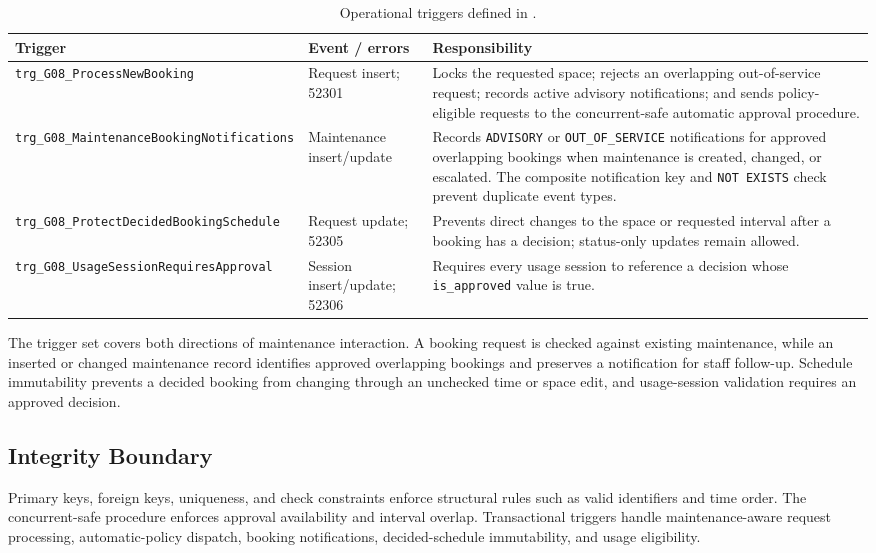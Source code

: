 \begin{table}[H]
  \centering
  \scriptsize
  \begin{tabularx}{\textwidth}{>{\raggedright\arraybackslash}p{4.8cm}>{\raggedright\arraybackslash}p{2.3cm}X}
    \toprule
    \textbf{Trigger} & \textbf{Event / errors} & \textbf{Responsibility}\\
    \midrule
    \nolinkurl{trg_G08_ProcessNewBooking} &
    Request insert; 52301 &
    Locks the requested space; rejects an overlapping out-of-service request; records active advisory notifications; and sends policy-eligible requests to the concurrent-safe automatic approval procedure.\\
    \nolinkurl{trg_G08_MaintenanceBookingNotifications} &
    Maintenance insert/update &
    Records \texttt{ADVISORY} or \texttt{OUT\_OF\_SERVICE} notifications for approved overlapping bookings when maintenance is created, changed, or escalated. The composite notification key and \texttt{NOT EXISTS} check prevent duplicate event types.\\
    \nolinkurl{trg_G08_ProtectDecidedBookingSchedule} &
    Request update; 52305 &
    Prevents direct changes to the space or requested interval after a booking has a decision; status-only updates remain allowed.\\
    \nolinkurl{trg_G08_UsageSessionRequiresApproval} &
    Session insert/update; 52306 &
    Requires every usage session to reference a decision whose \texttt{is\_approved} value is true.\\
    \bottomrule
  \end{tabularx}
  \caption{Operational triggers defined in .}
  \label{tab:operational-triggers}
\end{table}

The trigger set covers both directions of maintenance interaction. A booking request is checked against existing maintenance, while an inserted or changed maintenance record identifies approved overlapping bookings and preserves a notification for staff follow-up. Schedule immutability prevents a decided booking from changing through an unchecked time or space edit, and usage-session validation requires an approved decision.

\subsection{Integrity Boundary}

Primary keys, foreign keys, uniqueness, and check constraints enforce structural rules such as valid identifiers and time order. The concurrent-safe procedure enforces approval availability and interval overlap. Transactional triggers handle maintenance-aware request processing, automatic-policy dispatch, booking notifications, decided-schedule immutability, and usage eligibility.
